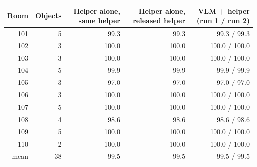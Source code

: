 \begin{tabular}{@{}rrrrr@{}}
\toprule
Room & Objects & Helper alone, same helper & Helper alone, released helper & VLM + helper (run 1 / run 2) \\
\midrule
101 & 5 & 99.3 & 99.3 & 99.3 / 99.3 \\
102 & 3 & 100.0 & 100.0 & 100.0 / 100.0 \\
103 & 3 & 100.0 & 100.0 & 100.0 / 100.0 \\
104 & 5 & 99.9 & 99.9 & 99.9 / 99.9 \\
105 & 3 & 97.0 & 97.0 & 97.0 / 97.0 \\
106 & 3 & 100.0 & 100.0 & 100.0 / 100.0 \\
107 & 5 & 100.0 & 100.0 & 100.0 / 100.0 \\
108 & 4 & 98.6 & 98.6 & 98.6 / 98.6 \\
109 & 5 & 100.0 & 100.0 & 100.0 / 100.0 \\
110 & 2 & 100.0 & 100.0 & 100.0 / 100.0 \\
\midrule
mean & 38 & 99.5 & 99.5 & 99.5 / 99.5 \\
\bottomrule
\end{tabular}
